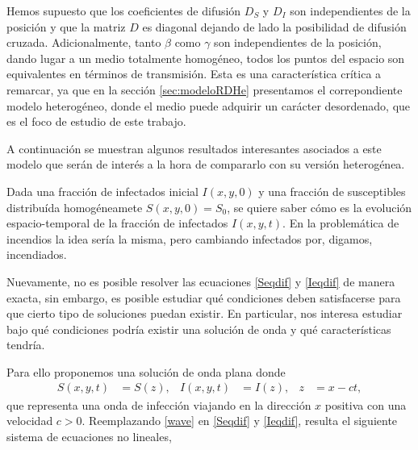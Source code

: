 Hemos supuesto que los coeficientes de difusión $D_{S}$ y $D_{I}$ son independientes de la posición y que la matriz $D$ es diagonal 
dejando de lado la posibilidad de difusión cruzada. Adicionalmente, tanto $\beta$ como $\gamma$ son 
independientes de la posición, dando lugar a un medio totalmente homogéneo, todos los puntos del espacio son equivalentes en términos de transmisión. Esta 
es una característica crítica a remarcar, ya que en la sección \ref{sec:modeloRDHe} presentamos el correpondiente modelo heterogéneo, donde 
el medio puede adquirir un carácter desordenado, que es el foco de estudio de este trabajo.

A continuación se muestran algunos resultados interesantes asociados a este modelo que serán de interés a la hora de compararlo con su versión heterogénea.


Dada una fracción de infectados inicial $I(x,y,0)$ y una fracción de susceptibles 
distribuída homogéneamete $S(x,y,0)=S_0$, se quiere saber cómo es la evolución espacio-temporal de la fracción de infectados $I(x,y,t)$. En la problemática 
de incendios la idea sería la misma, pero cambiando infectados por, digamos, incendiados. 

Nuevamente, no es posible resolver las ecuaciones \ref{Seqdif} y \ref{Ieqdif} de manera exacta, sin embargo, es posible estudiar qué condiciones deben 
satisfacerse para que cierto tipo de soluciones puedan existir. En particular, nos interesa estudiar bajo qué condiciones podría existir una solución de onda 
y qué características tendría.

Para ello proponemos una solución de onda plana donde 
\begin{align}
  S(x,y,t)&=S(z), & I(x,y,t)&=I(z), &  z&=x-ct, \label{wave}
\end{align}
que representa una onda de infección viajando en la dirección $x$ positiva con una velocidad $c>0$. Reemplazando \ref{wave} en \ref{Seqdif} y \ref{Ieqdif}, resulta el 
siguiente sistema de ecuaciones no lineales,

